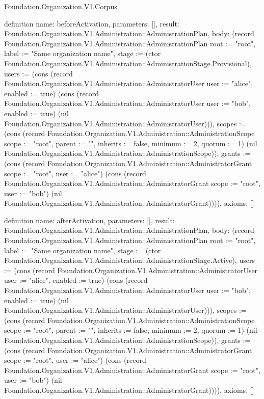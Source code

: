 \begin{lexlean}{Foundation.Organization.V1.Corpus}
\begin{semanticmodule}
definition{
  name: beforeActivation,
  parameters: [],
  result: Foundation.Organization.V1.Administration::AdministrationPlan,
  body: (record Foundation.Organization.V1.Administration::AdministrationPlan {root := "root", label := "Same organization name", stage := (ctor Foundation.Organization.V1.Administration::AdministrationStage.Provisional), users := (cons (record Foundation.Organization.V1.Administration::AdministratorUser {user := "alice", enabled := true}) (cons (record Foundation.Organization.V1.Administration::AdministratorUser {user := "bob", enabled := true}) (nil Foundation.Organization.V1.Administration::AdministratorUser))), scopes := (cons (record Foundation.Organization.V1.Administration::AdministrationScope {scope := "root", parent := "", inherits := false, minimum := 2, quorum := 1}) (nil Foundation.Organization.V1.Administration::AdministrationScope)), grants := (cons (record Foundation.Organization.V1.Administration::AdministratorGrant {scope := "root", user := "alice"}) (cons (record Foundation.Organization.V1.Administration::AdministratorGrant {scope := "root", user := "bob"}) (nil Foundation.Organization.V1.Administration::AdministratorGrant)))}),
  axioms: []
}

definition{
  name: afterActivation,
  parameters: [],
  result: Foundation.Organization.V1.Administration::AdministrationPlan,
  body: (record Foundation.Organization.V1.Administration::AdministrationPlan {root := "root", label := "Same organization name", stage := (ctor Foundation.Organization.V1.Administration::AdministrationStage.Active), users := (cons (record Foundation.Organization.V1.Administration::AdministratorUser {user := "alice", enabled := true}) (cons (record Foundation.Organization.V1.Administration::AdministratorUser {user := "bob", enabled := true}) (nil Foundation.Organization.V1.Administration::AdministratorUser))), scopes := (cons (record Foundation.Organization.V1.Administration::AdministrationScope {scope := "root", parent := "", inherits := false, minimum := 2, quorum := 1}) (nil Foundation.Organization.V1.Administration::AdministrationScope)), grants := (cons (record Foundation.Organization.V1.Administration::AdministratorGrant {scope := "root", user := "alice"}) (cons (record Foundation.Organization.V1.Administration::AdministratorGrant {scope := "root", user := "bob"}) (nil Foundation.Organization.V1.Administration::AdministratorGrant)))}),
  axioms: []
}


\end{semanticmodule}
\end{lexlean}
